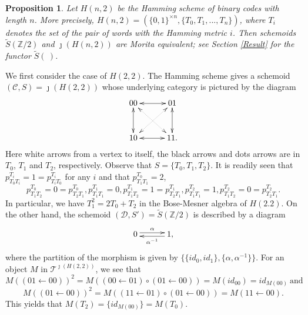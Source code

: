 \documentclass{amsart}
\newtheorem{prop}[thm]{Proposition}
\theoremstyle{definition}
\theoremstyle{remark}
\newcommand{\C}{{\mathcal C}}
\newcommand{\T}{{\mathcal T}}
\newcommand{\D}{\mathcal{D}}
\begin{document}
\begin{prop}\label{prop:group_Hamming} Let $H(n, 2)$ be the Hamming scheme of binary codes with length $n$. More precisely, 
$H(n, 2)=( \{0, 1\}^{\times n}, \{T_0, T_1, ..., T_n\} )$, 
where $T_i$ denotes the set of the pair of words with the Hamming metric $i$. 
Then schemoids $\widetilde{S}({\mathbb Z}/2)$ and  $\jmath(H(n, 2))$ are Morita equivalent; see Section \ref{Result} for the functor 
$\widetilde{S}( \ )$. 
\end{prop}

We first consider the case of $H(2,2)$. 
The Hamming scheme gives a schemoid  $(\C, S)=\jmath(H(2,2))$ whose underlying category is pictured by 
the diagram  
$$
\xymatrix@C30pt@R30pt{
{00}  \ar@{<->}[r] \ar@{<.>}[rd]  \ar@{<->}[d] &  {01}  \ar@{<->}[d]\\
{10} \ar@{<->}[r] \ar@{<.>}[ru] &  {11}. 
}
$$
Here white arrows from a vertex to itself,  the black arrows and dots arrows are 
in $T_0$, $T_1$ and $T_2$, respectively. Observe that $S=\{T_0, T_1, T_2\}$. It is readily seen that 
$p_{T_0T_i}^{T_i} = 1 = p_{T_iT_0}^{T_i}$ for any $i$ and that $p_{T_1T_1}^{T_0}= 2$, 
$$
p_{T_1T_2}^{T_0} = 0 = p_{T_2T_1}^{T_0}, p_{T_1T_1}^{T_1} =0, 
p_{T_1T_2}^{T_1} = 1 = p_{T_2T_1}^{T_1}, p_{T_1T_1}^{T_2}= 1, p_{T_1T_2}^{T_2} = 0 = p_{T_2T_1}^{T_2}. 
$$ 
In particular, we have $T_1^2 = 2T_0 + T_2$ in the Bose-Mesner algebra of $H(2.2)$.
On the other hand, the schemoid $(\D, S')= \widetilde{S}({\mathbb Z}/2)$ is described by 
a diagram 
$$
\xymatrix@C30pt@R30pt{
{0}  \ar@<0.5ex>[r]^-{\alpha} &  {1} \ar@<0.5ex>[l]^-{\alpha^{-1}} ,   
}
$$
where the partition of the morphism is given by $\{\{id_0, id_1\}, \{\alpha, \alpha^{-1}\} \}$. 
For an object $M$ in $\T^{\jmath(H(2,2))}$, we see that  
$$M((01 \leftarrow 00))^2= M((00 \leftarrow 01)\circ (01 \leftarrow 00))= M(id_{00}) =id_{M(00)} \ \text{and} $$ 
$$M((01 \leftarrow 00))^2= M((11 \leftarrow 01)\circ (01 \leftarrow 00))= M(11 \leftarrow 00).$$ This yields that 
$M(T_2) =\{id_{M(00)}\}=M(T_0)$. 
\end{document}

